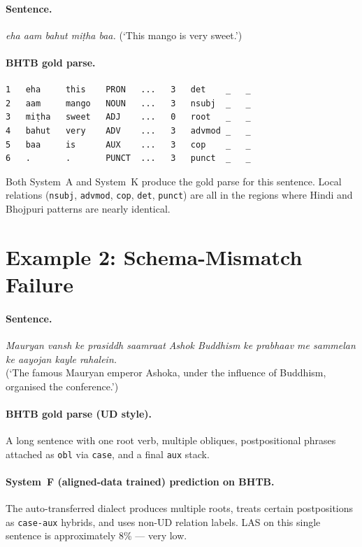 \documentclass[12pt,a4paper,oneside]{report}
\begin{document}
\paragraph{Sentence.} \emph{eha aam bahut miṭha baa.} (`This mango is very sweet.')

\paragraph{BHTB gold parse.}
\begin{verbatim}
1   eha     this    PRON   ...   3   det    _   _
2   aam     mango   NOUN   ...   3   nsubj  _   _
3   miṭha   sweet   ADJ    ...   0   root   _   _
4   bahut   very    ADV    ...   3   advmod _   _
5   baa     is      AUX    ...   3   cop    _   _
6   .       .       PUNCT  ...   3   punct  _   _
\end{verbatim}

Both System~A and System~K produce the gold parse for this sentence. Local
relations (\texttt{nsubj}, \texttt{advmod}, \texttt{cop}, \texttt{det},
\texttt{punct}) are all in the regions where Hindi and Bhojpuri patterns are
nearly identical.

\section{Example 2: Schema-Mismatch Failure}

\paragraph{Sentence.}
\emph{Mauryan vansh ke prasiddh saamraat Ashok Buddhism ke prabhaav me sammelan
ke aayojan kayle rahalein.}\\
(`The famous Mauryan emperor Ashoka, under the influence of Buddhism, organised
the conference.')

\paragraph{BHTB gold parse (UD style).}
A long sentence with one root verb, multiple obliques, postpositional phrases
attached as \texttt{obl} via \texttt{case}, and a final \texttt{aux} stack.

\paragraph{System~F (aligned-data trained) prediction on BHTB.}
The auto-transferred dialect produces multiple roots, treats certain
postpositions as \texttt{case-aux} hybrids, and uses non-UD relation labels.
LAS on this single sentence is approximately 8\% --- very low.
\end{document}
